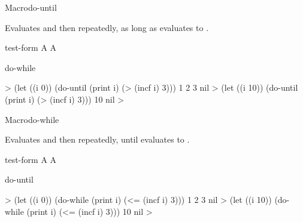 \documentclass[10pt,twoside,english,pdftex]{article}
\begin{document}
\begin{functiondoc}{Macro}{do-until}{}
%
  
\fnsyntax

\fnpurpose Evaluates  and then 
repeatedly, as long as  evaluates to \nil.

\fnpackage {}

\fnmodule {}

\fnargs
\begin{args}{test-form}
\arg[form] A 
 A 
\end{args}

\begin{alsos}{do-while}
\also[do-while]
\also[until]
\also[while]
\end{alsos}

\fnexamples
%
\W\supp
\begin{example}
  > (let ((i 0)) 
      (do-until (print i)
          (> (incf i) 3)))
  1 
  2 
  3 
  nil\goodpagebreak
  > (let ((i 10)) 
      (do-until (print i)
          (> (incf i) 3)))
  10
  nil
  >
\end{example}

\end{functiondoc}


\begin{functiondoc}{Macro}{do-while}{}
%
  
\fnsyntax

\fnpurpose Evaluates  and then 
repeatedly, until  evaluates to \nil.

\fnpackage {}

\fnmodule {}

\fnargs
\begin{args}{test-form}
\arg[form] A 
 A 
\end{args}

\begin{alsos}{do-until}
\also[do-until]
\also[until]
\also[while]
\end{alsos}

\fnexamples
%
\W\supp
\begin{example}
  > (let ((i 0)) 
      (do-while (print i)
          (<= (incf i) 3)))
  1 
  2 
  3 
  nil\goodpagebreak
  > (let ((i 10)) 
      (do-while (print i)
          (<= (incf i) 3)))
  10
  nil
  >
\end{example}

\end{functiondoc}
\end{document}
